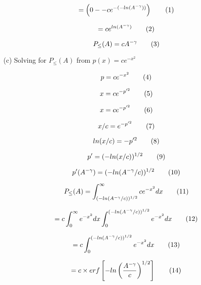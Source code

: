 \[
  =
  \left(
    0
      -
    -ce^{-(-ln(A^{-\gamma}))}
  \right)
  \addtag
\]

\[
  =
  ce^{ln(A^{-\gamma})}
  \addtag
\]

\[
  P_\leq (A)
  =
  cA^{-\gamma}
  \addtag
\]

(c) Solving for
$P_\leq (A)$
from
$p(x) = ce^{-x^2}$

\[
  p = ce^{-x^2}
  \addtag
\]

\[
  x = ce^{-p'^2}
  \addtag
\]

\[
  x = ce^{-p'^2}
  \addtag
\]

\[
  x / c
  =
  e^{-p'^2}
  \addtag
\]

\[
  ln(x / c)
  =
  -p'^2
  \addtag
\]

\[
  p'
  =
  (-ln(x / c))^{1/2}
  \addtag
\]

\[
  p'(A^{-\gamma})
  =
  (-ln(A^{-\gamma} / c))^{1/2}
  \addtag
\]

\[
  P_\leq (A)
  =
  \int_{
    (-ln(A^{-\gamma} / c))^{1/2}
  }^\infty
    ce^{-x^2}
    dx
  \addtag
\]

\[
  =
  c
  \int_{0}^\infty
    e^{-x^2}
    dx
  \int_{0}^{
    (-ln(A^{-\gamma} / c))^{1/2}
  }
    e^{-x^2}
    dx
  \addtag
\]

\[
  =
  c
  \int_{0}^{
    (-ln(A^{-\gamma} / c))^{1/2}
  }
    e^{-x^2}
    dx
  \addtag
\]

\[
  =
  c
  \times 
  erf
  \left[
    -ln
    \left(
      \frac{
        A^{-\gamma}
      }{
        c
      }
    \right)
    ^{1/2}
  \right]
  \addtag
\]